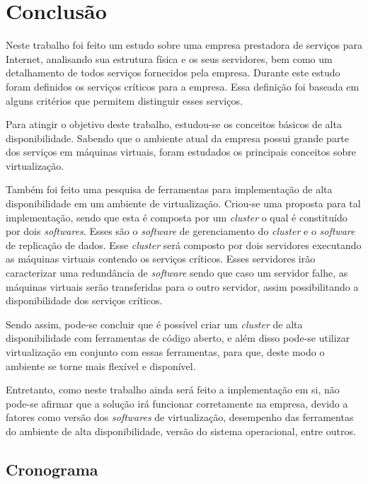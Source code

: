 \chapter{Conclusão}
\label{cap:conclusao}

Neste trabalho foi feito um estudo sobre uma empresa prestadora de serviços para Internet, analisando sua estrutura física e os seus servidores, 
bem como um detalhamento de todos serviços fornecidos pela empresa. Durante este estudo foram definidos os serviços críticos para a empresa.
Essa definição foi baseada em alguns critérios que permitem distinguir esses serviços.

Para atingir o objetivo deste trabalho, estudou-se os conceitos básicos de alta disponibilidade. Sabendo que o ambiente atual da empresa possui 
grande parte dos serviços em máquinas virtuais, foram estudados os principais conceitos sobre virtualização.

Também foi feito uma pesquisa de ferramentas para implementação de alta disponibilidade em um ambiente de virtualização. Criou-se uma proposta 
para tal implementação, sendo que esta é composta por um \textit{cluster} o qual é constituído por dois \textit{softwares}. Esses são o 
\textit{software} de gerenciamento do \textit{cluster} e o \textit{software} de replicação de dados. %
Esse \textit{cluster} será composto por dois servidores executando as máquinas virtuais contendo os serviços críticos. Esses servidores 
irão caracterizar uma redundância de \textit{software} sendo que caso um servidor falhe, as máquinas virtuais serão transferidas para o outro
servidor, assim possibilitando a disponibilidade dos serviços críticos.

Sendo assim, pode-se concluir que é possível criar um \textit{cluster} de alta disponibilidade com ferramentas de código aberto, e além disso 
pode-se utilizar virtualização em conjunto com essas ferramentas, para que, deste modo o ambiente se torne mais flexível e disponível. 

Entretanto, como neste trabalho ainda será feito a implementação em si, não pode-se afirmar que a solução irá funcionar corretamente
na empresa, devido a fatores como versão dos \textit{softwares} de virtualização, desempenho das ferramentas do ambiente de alta disponibilidade, 
versão do sistema operacional, entre outros.

\newpage
\section{Cronograma}
\label{section:cronograma}

